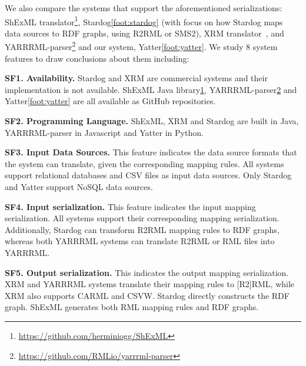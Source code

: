 We also compare the systems that support the aforementioned serializations: 
ShExML translator\footnote{\label{foot:shexml}\url{https://github.com/herminiogg/ShExML}}, %
Stardog\cref{foot:stardog} %
(with focus on how Stardog maps data sources to RDF graphs, using R2RML or SMS2),
XRM translator~\parencite{xrm}, and
YARRRML-parser\footnote{\label{foot:yarrrml-p}\url{https://github.com/RMLio/yarrrml-parser}} and our system, Yatter\cref{foot:yatter}. 
We study 8 system features to draw conclusions about them including:

\textbf{SF1. Availability.}
Stardog and XRM are commercial systems and their implementation is not available. ShExML Java library\cref{foot:shexml}, YARRRML-parser\cref{foot:yarrrml-p} and Yatter\cref{foot:yatter} are all available as GitHub repositories. 

\textbf{SF2. Programming Language.} ShExML, XRM and Stardog are built in Java, YARRRML-parser in Javascript and Yatter in Python.

\textbf{SF3. Input Data Sources.} This feature indicates the data source formats that the system can translate, given the corresponding mapping rules. 
All systems support relational databases and CSV files as input data sources. Only Stardog and Yatter support NoSQL data sources.


\textbf{SF4. Input serialization.}
This feature indicates the input mapping serialization. 
All systems support their corresponding mapping serialization. 
Additionally, Stardog can transform R2RML mapping rules to RDF graphs, whereas both YARRRML systems can translate R2RML or RML files into YARRRML.

\textbf{SF5. Output serialization.} 
This indicates the output mapping serialization. 
XRM and YARRRML systems translate their mapping rules to [R2]RML, while XRM also supports CARML and CSVW. 
Stardog directly constructs the RDF graph. 
ShExML generates both RML mapping rules and RDF graphs.

